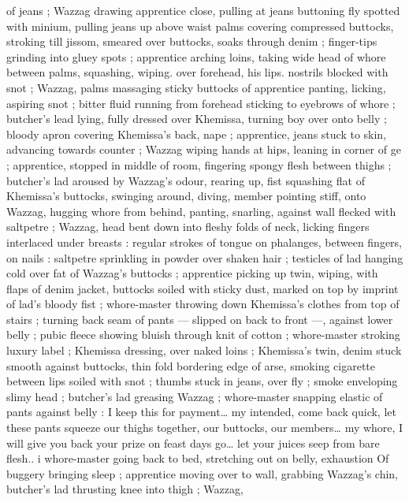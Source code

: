 of jeans ; Wazzag drawing apprentice close, pulling at jeans 
buttoning fly spotted with minium, pulling jeans up above waist 
palms covering compressed buttocks, stroking till jissom, smeared 
over buttocks, soaks through denim ; finger-tips grinding into gluey 
spots ; apprentice arching loins, taking wide head of whore between 
palms, squashing, wiping. over forehead, his lips. nostrils blocked 
with snot ; Wazzag, palms massaging sticky buttocks of apprentice 
panting, licking, aspiring snot ; bitter fluid running from forehead 
sticking to eyebrows of whore ; butcher's lead lying, fully dressed 
over Khemissa, turning boy over onto belly ; bloody apron covering 
Khemissa's back, nape ; apprentice, jeans stuck to skin, advancing 
towards counter ; Wazzag wiping hands at hips, leaning in corner of 
ge ; apprentice, stopped in middle of room, fingering spongy 
flesh between thighs ; butcher's lad aroused by Wazzag's odour, 
rearing up, fist squashing flat of Khemissa's buttocks, swinging 
around, diving, member pointing stiff, onto Wazzag, hugging whore 
from behind, panting, snarling, against wall flecked with saltpetre ; 
Wazzag, head bent down into fleshy folds of neck, licking fingers 
interlaced under breasts : regular strokes of tongue on phalanges, 
between fingers, on nails : saltpetre sprinkling in powder over shaken 
hair ; testicles of lad hanging cold over fat of Wazzag's buttocks ; 
apprentice picking up twin, wiping, with flaps of denim jacket, 
buttocks soiled with sticky dust, marked on top by imprint of lad's 
bloody fist ; whore-master throwing down Khemissa's clothes from 
top of stairs ; turning back seam of pants --- slipped on back to front 
---, against lower belly ; pubic fleece showing bluish through knit of 
cotton ; whore-master stroking luxury label ; Khemissa dressing, over 
naked loins ; Khemissa's twin, denim stuck smooth against buttocks, 
thin fold bordering edge of arse, smoking cigarette between lips 
soiled with snot ; thumbs stuck in jeans, over fly ; smoke enveloping 
slimy head ; butcher's lad greasing Wazzag ; whore-master snapping 
elastic of pants against belly : {\gl}{\td} I keep this for payment{\ldots} my 
intended, come back quick, let these pants squeeze our thighs 
together, our buttocks, our members{\ldots} my whore, I will give you back 
your prize on feast days{\td} go{\ldots} let your juices seep from bare flesh..{\gr} 
i whore-master going back to bed, stretching out on belly, exhaustion 
Of buggery bringing sleep ; apprentice moving over to wall, grabbing 
Wazzag's chin, butcher's lad thrusting knee into thigh ; Wazzag, 
